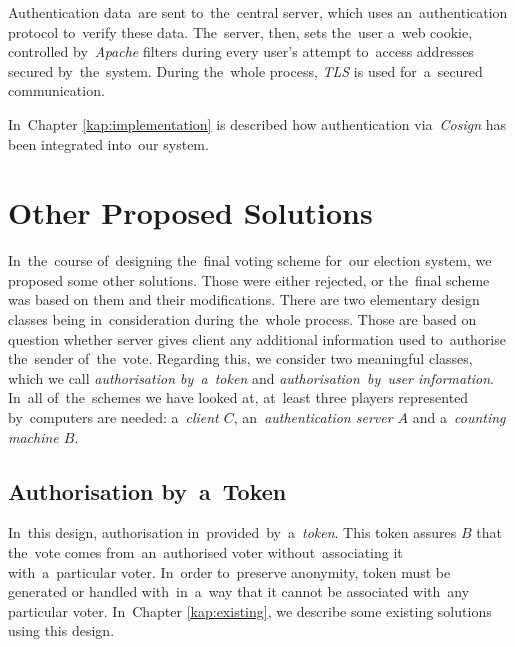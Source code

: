 Authentication data~are sent to~the~central server, which uses an~authentication protocol to~verify these data. The~server, then, sets the~user a~web cookie, controlled by~\emph{Apache} filters during every user's attempt to~access addresses secured by~the~system. During the~whole process, \emph{TLS} is used for~a~secured communication.

In~Chapter \ref{kap:implementation} is described how authentication via~\emph{Cosign} has been integrated into~our system.

\section{Other Proposed Solutions}
In~the~course of~designing the~final voting scheme for~our election system, we proposed some other solutions. Those were either rejected, or the~final scheme was based on them and their modifications.
There are two elementary design classes being in~consideration during the~whole process. Those are based on question whether server gives client any additional information used to~authorise the~sender of~the~vote. Regarding this, we consider two meaningful classes, which we call \emph{authorisation by~a~token} and \emph{authorisation~by~user information}. In~all of~the~schemes we have looked at, at~least three players represented by~computers are needed: a~\emph{client $C$}, an~\emph{authentication server $A$} and a~\emph{counting machine $B$}.

\subsection{Authorisation by~a~Token}
In~this design, authorisation in~provided~by~a~\emph{token}. This token assures $B$ that the~vote comes from~an~authorised voter without~associating it with~a~particular voter. In~order to~preserve anonymity, token must be generated or handled with~in~a~way that it cannot be associated with~any particular voter. In~Chapter \ref{kap:existing}, we describe some existing solutions using this design. 

